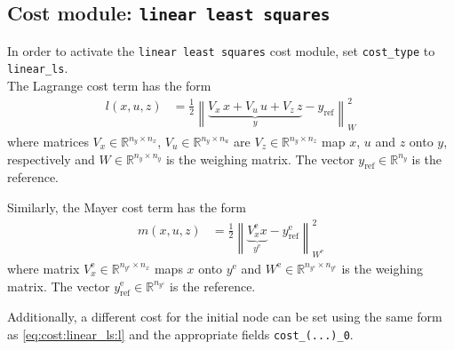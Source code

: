\documentclass[english]{article}
\newcommand{\code}[1]{\texttt{#1}}
\newcommand{\norm}[1]{\left\lVert#1\right\rVert}
\newcommand{\ind}[1]{_{\textrm{#1}}}
\newcommand{\terminal}{^{\textrm{e}}}
\begin{document}
\subsection{Cost module: \code{linear least squares}}\label{sec:cost:linear_ls}
%
In order to activate the \code{linear least squares} cost module, set \code{cost\_type} to \code{linear\_ls}.\\
The Lagrange cost term has the form
\begin{align}
l(x, u, z) &= \frac{1}{2} \norm{ \underbrace{V_x\, x + V_u\, u + V_z\, z}_{\displaystyle y} - y\ind{ref}}_W^2 \label{eq:cost:linear_ls:l}
\end{align}
where matrices $ V_x \in \mathbb{R}^{n_y \times n_x}$, $V_u \in \mathbb{R}^{n_y \times n_u}$ are $V_z \in \mathbb{R}^{n_y \times n_z}$ map $x$, $u$ and $z$ onto $y$, respectively and $W \in \mathbb{R}^{n_y \times n_y}$ is the weighing matrix. The vector $y\ind{ref} \in \mathbb{R}^{n_y}$ is the reference.

Similarly, the Mayer cost term has the form
\begin{align}
m(x, u, z) &= \frac{1}{2} \norm{ \underbrace{V_x\terminal x}_{\displaystyle y\terminal} - y\ind{ref}\terminal}_{W\terminal}^2 \label{eq:cost:linear_ls:m}
\end{align}
where matrix $ V\terminal_x \in \mathbb{R}^{n_{y\terminal} \times n_x}$ maps $x$ onto $y\terminal$ and $W\terminal \in \mathbb{R}^{n_{y\terminal} \times n_{y\terminal}}$ is the weighing matrix. The vector $y\terminal_\textrm{ref} \in \mathbb{R}^{n_{y\terminal}}$ is the reference.

Additionally, a different cost for the initial node can be set using the same form as \eqref{eq:cost:linear_ls:l} and the appropriate fields \code{cost\_(...)\_0}.
\end{document}
